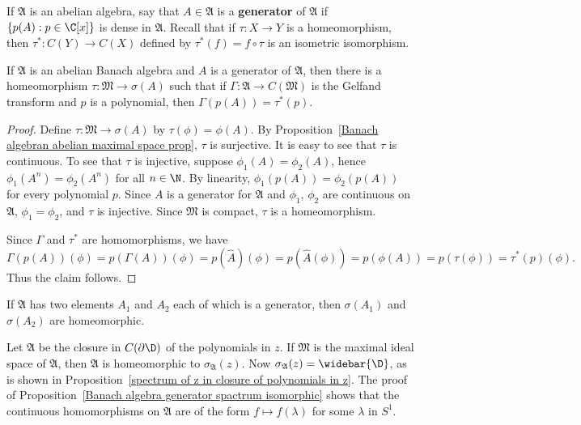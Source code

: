 If $\mathfrak{A}$ is an abelian algebra, say that $A\in\mathfrak{A}$ is a \textbf{generator} of $\mathfrak{A}$ if $\{p(A):p\in\C[x]\}$ is dense in $\mathfrak{A}$. Recall that if $\tau:X\to Y$ is a homeomorphism, then $\tau^*:C(Y)\to C(X)$ defined by $\tau^*(f)=f\circ\tau$ is an isometric isomorphism.
\begin{proposition}\label{Banach algebra generator spactrum isomorphic}
If $\mathfrak{A}$ is an abelian Banach algebra and $A$ is a generator of $\mathfrak{A}$, then there is a homeomorphism $\tau:\mathfrak{M}\to\sigma(A)$ such that if $\Gamma:\mathfrak{A}\to C(\mathfrak{M})$ is the Gelfand transform and $p$ is a polynomial, then $\Gamma(p(A))=\tau^*(p)$.
\end{proposition}
\begin{proof}
Define $\tau:\mathfrak{M}\to\sigma(A)$ by $\tau(\phi)=\phi(A)$. By Proposition~\ref{Banach algebran abelian maximal space prop}, $\tau$ is surjective. It is easy to see that $\tau$ is continuous. To see that $\tau$ is injective, suppose $\phi_1(A)=\phi_2(A)$, hence $\phi_1(A^n)=\phi_2(A^n)$ for all $n\in\N$. By linearity, $\phi_1(p(A))=\phi_2(p(A))$ for every polynomial $p$. Since $A$ is a generator for $\mathfrak{A}$ and $\phi_1$, $\phi_2$ are continuous on $\mathfrak{A}$, $\phi_1=\phi_2$, and $\tau$ is injective. Since $\mathfrak{M}$ is compact, $\tau$ is a homeomorphism.\par
Since $\Gamma$ and $\tau^*$ are homomorphisms, we have
\[\Gamma(p(A))(\phi)=p(\Gamma(A))(\phi)=p(\hat{A})(\phi)=p(\hat{A}(\phi))=p(\phi(A))=p(\tau(\phi))=\tau^*(p)(\phi).\]
Thus the claim follows.
\end{proof}
\begin{corollary}
If $\mathfrak{A}$ has two elements $A_1$ and $A_2$ each of which is a generator, then $\sigma(A_1)$ and $\sigma(A_2)$ are homeomorphic.
\end{corollary}
\begin{example}
Let $\mathfrak{A}$ be the closure in $C(\partial\D)$ of the polynomials in $z$. If $\mathfrak{M}$ is the maximal ideal space of $\mathfrak{A}$, then $\mathfrak{A}$ is homeomorphic to $\sigma_{\mathfrak{A}}(z)$. Now $\sigma_{\mathfrak{A}}(z)=\widebar{\D}$, as is shown in Proposition~\ref{spectrum of z in closure of polynomials in z}. The proof of Proposition~\ref{Banach algebra generator spactrum isomorphic} shows that the continuous homomorphisms on $\mathfrak{A}$ are of the form $f\mapsto f(\lambda)$ for some $\lambda$ in $S^1$.
\end{example}
